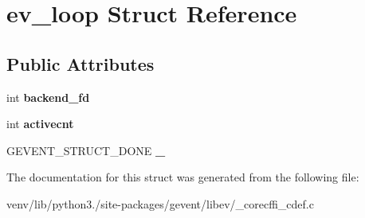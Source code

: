 \hypertarget{structev__loop}{}\section{ev\+\_\+loop Struct Reference}
\label{structev__loop}
\subsection*{Public Attributes}
\begin{DoxyCompactItemize}
\item 
\mbox{\label{structev__loop_a405fa4c37e3e8248064db5ae496fb9ca}} 
int {\bfseries backend\+\_\+fd}
\item 
\mbox{\label{structev__loop_a0c851d9b15616333e0610ec163ba8399}} 
int {\bfseries activecnt}
\item 
\mbox{\label{structev__loop_a1e226976c9aed5477273a8a819a2509e}} 
G\+E\+V\+E\+N\+T\+\_\+\+S\+T\+R\+U\+C\+T\+\_\+\+D\+O\+NE {\bfseries \+\_\+}
\end{DoxyCompactItemize}


The documentation for this struct was generated from the following file\+:\begin{DoxyCompactItemize}
\item 
venv/lib/python3./site-\/packages/gevent/libev/\+\_\+corecffi\+\_\+cdef.\+c\end{DoxyCompactItemize}
